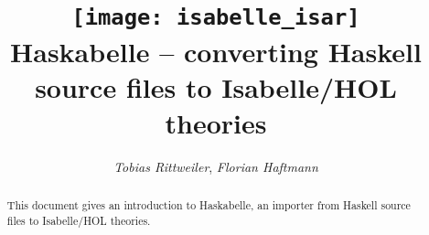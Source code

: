 \documentclass[12pt,a4paper,fleqn]{report}
\title{\texttt{[image: isabelle\_isar]}
  \\[4ex] Haskabelle -- converting Haskell source files to Isabelle/HOL theories}
\author{\emph{Tobias Rittweiler}, \emph{Florian Haftmann}}
\begin{document}
\maketitle

\begin{abstract}
  This document gives an introduction to Haskabelle, an importer from
  Haskell source files to Isabelle/HOL theories.
\end{abstract}

\thispagestyle{empty}\clearpage

\clearfirst



\begingroup
 \small\raggedright\frenchspacing

\endgroup
\end{document}
